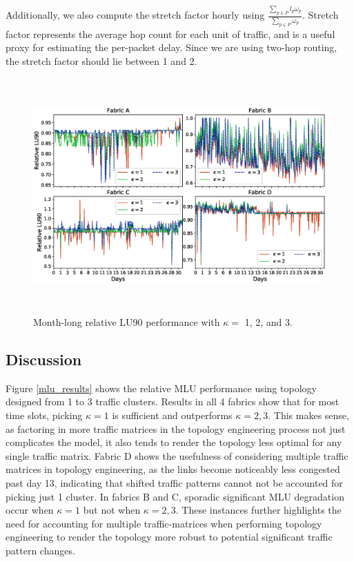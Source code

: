 \documentclass[sigconf]{acmart}
\theoremstyle{definition}
\begin{document}
Additionally, we also compute the stretch factor hourly using $\frac{\sum\limits_{p \in P}l_p \omega_p}{\sum \limits_{p \in P}\omega_p}$. Stretch factor represents the average hop count for each unit of traffic, and is a useful proxy for estimating the per-packet delay. Since we are using two-hop routing, the stretch factor should lie between 1 and 2.


\begin{figure}[t!]
\centering
\includegraphics[scale=1.2, width=\textwidth, height=9cm, trim={2cm 1.9cm 1cm 0.60cm}]{figures/lu90.eps}
\caption{Month-long relative LU90 performance with $\kappa = $ 1, 2, and 3.}
\label{lu90_results}
\end{figure}

\subsection{Discussion}
Figure \ref{mlu_results} shows the relative MLU performance using topology designed from 1 to 3 traffic clusters. Results in all 4 fabrics show that for most time slots, picking $\kappa = 1$ is sufficient and outperforms $\kappa = 2, 3$. This makes sense, as factoring in more traffic matrices in the topology engineering process not just complicates the model, it also tends to render the topology less optimal for any single traffic matrix. Fabric D shows the usefulness of considering multiple traffic matrices in topology engineering, as the links become noticeably less congested past day 13, indicating that shifted traffic patterns cannot not be accounted for picking just 1 cluster. In fabrics B and C, sporadic significant MLU degradation occur when $\kappa = 1$ but not when $\kappa = 2, 3$. These instances further highlights the need for accounting for multiple traffic-matrices when performing topology engineering to render the topology more robust to potential significant traffic pattern changes. 
\end{document}
